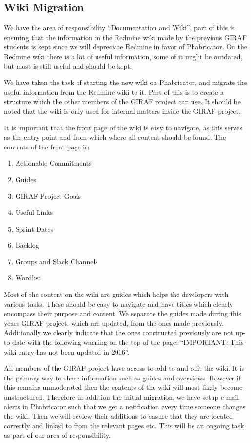 \subsection{Wiki Migration}
We have the area of responsibility ``Documentation and Wiki'', part of this is ensuring that the information in the Redmine wiki made by the previous GIRAF students is kept since we will depreciate Redmine in favor of Phabricator.
On the Redmine wiki there is a lot of useful information, some of it might be outdated, but most is still useful and should be kept. 

We have taken the task of starting the new wiki on Phabricator, and migrate the useful information from the Redmine wiki to it.
Part of this is to create a structure which the other members of the GIRAF project can use.
It should be noted that the wiki is only used for internal matters inside the GIRAF project.  

It is important that the front page of the wiki is easy to navigate, as this serves as the entry point and from which where all content should be found. 
The contents of the front-page is:

\begin{enumerate}[topsep=0pt,itemsep=-1ex,partopsep=1ex,parsep=1ex]
    \item Actionable Commitments
    \item Guides
    \item GIRAF Project Goals
    \item Useful Links
    \item Sprint Dates
    \item Backlog
    \item Groups and Slack Channels
    \item Wordlist
\end{enumerate}

Most of the content on the wiki are guides which helps the developers with various tasks. 
These should be easy to navigate and have titles which clearly encompass their purpose and content. 
We separate the guides made during this years GIRAF project, which are updated, from the ones made previously. 
Additionally we clearly indicate that the ones constructed previously are not up-to date with the following warning on the top of the page: ``IMPORTANT: This wiki entry has not been updated in 2016''. 

All members of the GIRAF project have access to add to and edit the wiki. 
It is the primary way to share information such as guides and overviews. 
However if this remains unmoderated then the contents of the wiki will most likely become unstructured. 
Therefore in addition the initial migration, we have setup e-mail alerts in Phabricator such that we get a notification every time someone changes the wiki.
Then we will review their additions to ensure that they are located correctly and linked to from the relevant pages etc. 
This will be an ongoing task as part of our area of responsibility.